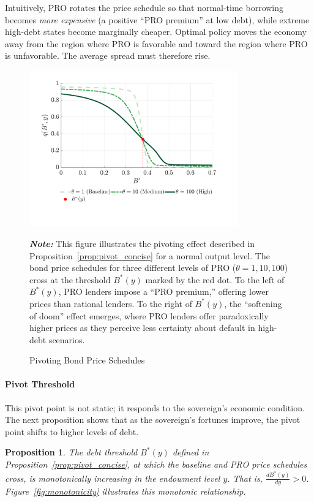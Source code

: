 \documentclass[12pt]{article}
\theoremstyle{plain}
\newtheorem{proposition}{Proposition}
\begin{document}
Intuitively, PRO rotates the price schedule so that normal-time borrowing
becomes \emph{more expensive} (a positive ``PRO premium'' at low debt), while
extreme high-debt states become marginally cheaper. Optimal policy moves the
economy away from the region where PRO is favorable and toward the region where
PRO is unfavorable. The average spread must therefore rise.

\begin{figure}[htb]
	\centering
	\includegraphics[width=0.8\textwidth]{../../pro-default-model/results/comparison_figure_5.pdf}
	\caption{Pivoting Bond Price Schedules}\label{fig:pivoting_proof}

	\parbox{\textwidth}{\small\textit{\textbf{Note:} }This figure illustrates the pivoting effect described in Proposition~\ref{prop:pivot_concise} for a normal output level. The bond price schedules for three different levels of PRO ($\theta = 1, 10, 100$) cross at the threshold $B^*(y)$ marked by the red dot. To the left of $B^*(y)$, PRO lenders impose a ``PRO premium,'' offering lower prices than rational lenders. To the right of $B^*(y)$, the ``softening of doom'' effect emerges, where PRO lenders offer paradoxically higher prices as they perceive less certainty about default in high-debt scenarios.}
\end{figure}

\paragraph{Pivot Threshold}This pivot point is not static; it responds to the sovereign's economic
condition. The next proposition shows that as the sovereign's fortunes improve,
the pivot point shifts to higher levels of debt.

\begin{proposition}
	\label{prop:monotonicity}
	The debt threshold $B^*(y)$ defined in Proposition~\ref{prop:pivot_concise}, at which the baseline and PRO price schedules cross, is monotonically increasing in the endowment level $y$. That is, $\frac{dB^*(y)}{dy} > 0$. Figure~\ref{fig:monotonicity} illustrates this monotonic relationship.
\end{proposition}
\end{document}
